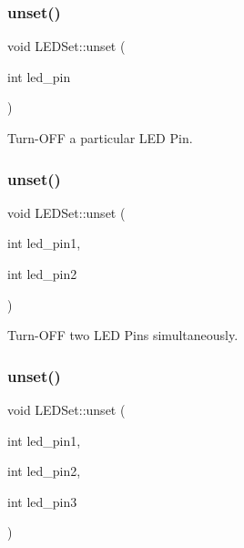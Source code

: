 \mbox{\label{classLEDSet_abfee31b85b957577a7ec07e101a36c8b}} 
\subsubsection{\texorpdfstring{unset()}{unset()}\hspace{0.1cm}{\footnotesize\ttfamily [1/3]}}
{\footnotesize\ttfamily void L\+E\+D\+Set\+::unset (\begin{DoxyParamCaption}\item[{int}]{led\+\_\+pin }\end{DoxyParamCaption})\hspace{0.3cm}{\ttfamily [inline]}}



Turn-\/\+O\+FF a particular L\+ED Pin. 

\mbox{\label{classLEDSet_a32c76a9ee5328ed6b6c167b4ce8578c9}} 
\subsubsection{\texorpdfstring{unset()}{unset()}\hspace{0.1cm}{\footnotesize\ttfamily [2/3]}}
{\footnotesize\ttfamily void L\+E\+D\+Set\+::unset (\begin{DoxyParamCaption}\item[{int}]{led\+\_\+pin1,  }\item[{int}]{led\+\_\+pin2 }\end{DoxyParamCaption})\hspace{0.3cm}{\ttfamily [inline]}}



Turn-\/\+O\+FF two L\+ED Pins simultaneously. 

\mbox{\label{classLEDSet_a23a820fbb738a3ba1c6e2b454d20ac68}} 
\subsubsection{\texorpdfstring{unset()}{unset()}\hspace{0.1cm}{\footnotesize\ttfamily [3/3]}}
{\footnotesize\ttfamily void L\+E\+D\+Set\+::unset (\begin{DoxyParamCaption}\item[{int}]{led\+\_\+pin1,  }\item[{int}]{led\+\_\+pin2,  }\item[{int}]{led\+\_\+pin3 }\end{DoxyParamCaption})\hspace{0.3cm}{\ttfamily [inline]}}




